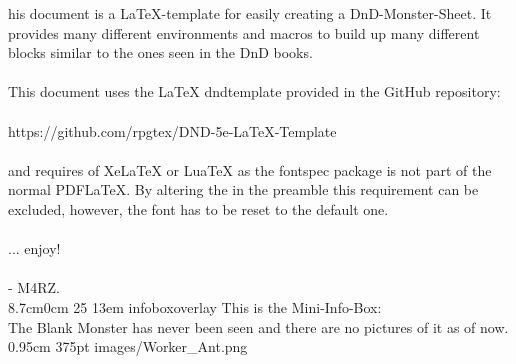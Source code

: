 \documentclass[letterpaper,openany,twoside,twocolumn]{book}
\begin{document}

\MonsterSheetGeometry

\mainmatter%



\entryfont \noindent {}his document is a LaTeX-template for easily creating a DnD-Monster-Sheet. It provides many different environments and macros to build up many different blocks similar to the ones seen in the DnD books.\\\\
This document uses the LaTeX dnd\textunderscore template provided in the GitHub repository:\\\\ https://github.com/rpgtex/DND-5e-LaTeX-Template\\\\ and requires of XeLaTeX or LuaTeX as the fontspec package is not part of the normal PDFLaTeX. By altering the \entryfont in the preamble this requirement can be excluded, however, the font has to be reset to the default one. \\\\
... enjoy!\\\\
- M4RZ.\\

\MonsterGraphicAndShortInfo%
	{8.7cm}{0cm}%
	{25}%
	{13em}%
	{infoboxoverlay} %
	{This is the Mini-Info-Box:\\The Blank Monster has never been seen and there are no pictures of it as of now.}%
	{0.95cm}%
	{375pt}%
	{images/Worker_Ant.png}%
\end{document}
